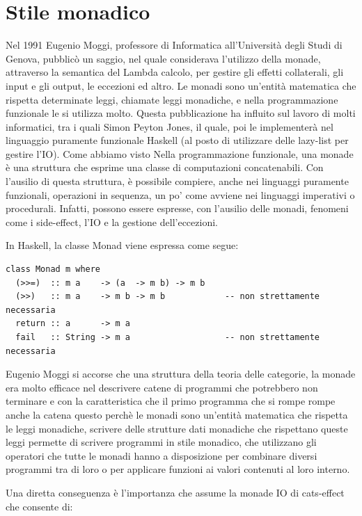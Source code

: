 \section{Stile monadico}
Nel 1991 Eugenio Moggi, professore di Informatica all'Università degli Studi di Genova, pubblicò un saggio, nel quale considerava l'utilizzo della monade, attraverso la semantica del Lambda calcolo, per gestire gli effetti collaterali, gli input e gli output, le eccezioni ed altro. Le monadi sono un'entità matematica che rispetta determinate leggi, chiamate leggi monadiche, e nella programmazione funzionale le si utilizza molto. Questa pubblicazione ha influito sul lavoro di molti informatici, tra i quali Simon Peyton Jones, il quale, poi le implementerà nel linguaggio puramente funzionale Haskell (al posto di utilizzare delle lazy-list per gestire l'IO). Come abbiamo visto Nella programmazione funzionale, una monade è una struttura che esprime una classe di computazioni concatenabili. Con l'ausilio di questa struttura, è possibile compiere, anche nei linguaggi puramente funzionali, operazioni in sequenza, un po' come avviene nei linguaggi imperativi o procedurali. Infatti, possono essere espresse, con l'ausilio delle monadi, fenomeni come i side-effect, l'IO e la gestione dell'eccezioni.

\noindent In Haskell, la classe Monad viene espressa come segue:
\begin{verbatim}
class Monad m where
  (>>=)  :: m a    -> (a  -> m b) -> m b
  (>>)   :: m a    -> m b -> m b            -- non strettamente necessaria
  return :: a      -> m a
  fail   :: String -> m a                   -- non strettamente necessaria
\end{verbatim}

Eugenio Moggi  si accorse che una struttura della teoria delle categorie, la monade era molto efficace nel descrivere catene di programmi che potrebbero non terminare e con la caratteristica che il primo programma che si rompe rompe anche la catena questo perchè le monadi sono un'entità matematica che rispetta le leggi monadiche, scrivere delle strutture dati monadiche che rispettano queste leggi permette di scrivere programmi in stile monadico, che utilizzano gli operatori che tutte le monadi hanno a disposizione per combinare diversi programmi tra di loro o per applicare funzioni ai valori contenuti al loro interno. 

Una diretta conseguenza è l'importanza che assume la monade IO di cats-effect che consente di: 

